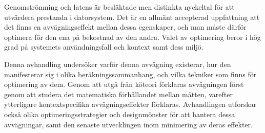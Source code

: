 \documentclass[english,12pt,a4paper,pdftex,sci,utf8]{aaltothesis}
\begin{document}
\newpage
%
%
\begin{abstractpage}[swedish]
 Genomströmning och latens är besläktade men distinkta nyckeltal för att utvärdera prestanda i datorsystem. Det är en allmänt accepterad uppfattning att det finns en avvägningseffekt mellan dessa egenskaper, och man måste därför optimera för den ena på bekostnad av den andra. Valet av optimering beror i hög grad på systemets användningsfall och kontext samt dess miljö.
 
 Denna avhandling undersöker varför denna avvägning existerar, hur den manifesterar sig i olika beräkningssammanhang, och vilka tekniker som finns för optimering av dem. Genom att utgå från köteori förklaras avvägningen först genom att studera det matematiska förhållandet mellan måtten, varefter ytterligare kontextspecifika avvägningseffekter förklaras. Avhandlingen utforskar också olika optimeringsstrategier och designmönster för att hantera dessa avvägningar, samt den senaste utvecklingen inom minimering av deras effekter.
\end{abstractpage}

\newpage



\thesistableofcontents




\cleardoublepage
\storeinipagenumber
{}
\setcounter{page}{1}


\end{document}
